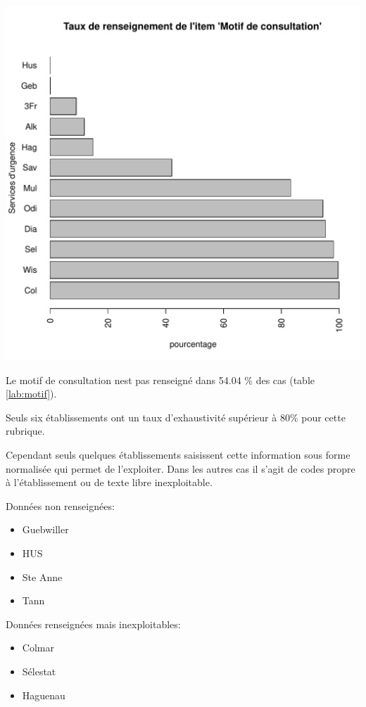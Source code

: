 \documentclass[12pt,english,french,twoside]{report}\usepackage[]{graphicx}\usepackage[]{color}
\makeatletter
\def\maxwidth{ %
  \ifdim\Gin@nat@width>\linewidth
    \linewidth
  \else
    \Gin@nat@width
  \fi
}
\makeatother
\begin{document}
\includegraphics[width=\maxwidth]{figure/motifss2} 



Le motif de consultation nest pas renseigné dans 54.04 \% des cas (table \ref{lab:motif}).

Seuls six établissements ont un taux d'exhaustivité supérieur à 80\% pour cette rubrique.

Cependant seuls quelques établissements saisissent cette information sous forme normalisée qui permet de l'exploiter. Dans les autres cas il s'agit de codes propre à l'établissement ou de texte libre inexploitable.

Données non renseignées:
\begin{itemize}
  \item Guebwiller
  \item HUS
  \item Ste Anne
  \item Tann
\end{itemize}

Données renseignées mais inexploitables:
\begin{itemize}
  \item Colmar
  \item Sélestat
  \item Haguenau
\end{itemize}
\end{document}
